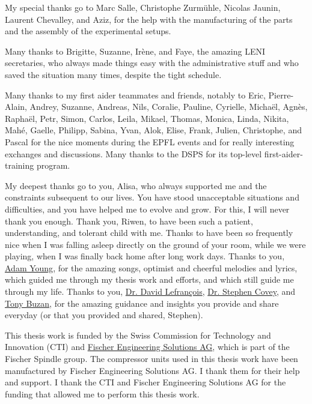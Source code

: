 My special thanks go to Marc Salle, Christophe Zurmühle, Nicolas
Jaunin, Laurent Chevalley, and Aziz, for the help with the
manufacturing of the parts and the assembly of the experimental
setups.

Many thanks to Brigitte, Suzanne, Irène, and Faye, the amazing LENI
secretaries, who always made things easy with the administrative stuff
and who saved the situation many times, despite the tight schedule.

Many thanks to my first aider teammates and friends, notably to Eric,
Pierre-Alain, Andrey, Suzanne, Andreas, Nils, Coralie, Pauline,
Cyrielle, Michaël, Agnès, Raphaël, Petr, Simon, Carlos, Leila, Mikael,
Thomas, Monica, Linda, Nikita, Mahé, Gaelle, Philipp, Sabina, Yvan,
Alok, Elise, Frank, Julien, Christophe, and Pascal for the nice
moments during the EPFL events and for really interesting exchanges
and discussions. Many thanks to the DSPS for its top-level
first-aider-training program.

My deepest thanks go to you, Alisa, who always supported me and the
constraints subsequent to our lives. You have stood unacceptable
situations and difficulties, and you have helped me to evolve and
grow. For this, I will never thank you enough. Thank you, Riwen, to
have been such a patient, understanding, and tolerant child with
me. Thanks to have been so frequently nice when I was falling asleep
directly on the ground of your room, while we were playing, when I was
finally back home after long work days. Thanks to you,
\href{https://en.wikipedia.org/wiki/Adam_Young}{Adam Young}, for the
amazing songs, optimist and cheerful melodies and lyrics, which guided
me through my thesis work and efforts, and which still guide me
through my life. Thanks to you,
\href{https://www.youtube.com/playlist?list=PLIB0FUzmhLoSCRLM2WFt_mz6plvulw6hU}{Dr. David
  Lefrançois},
\href{https://en.wikipedia.org/wiki/Stephen_Covey}{Dr. Stephen Covey},
and \href{https://en.wikipedia.org/wiki/Tony_Buzan}{Tony Buzan}, for
the amazing guidance and insights you provide and share everyday (or
that you provided and shared, Stephen).

This thesis work is funded by the Swiss Commission for Technology and
Innovation (CTI) and
\href{http://www.fischerspindle.com/facilities/fischer-engineering-solutions-ag/}{Fischer
  Engineering Solutions AG}, which is part of the Fischer Spindle
group. The compressor units used in this thesis work have been
manufactured by Fischer Engineering Solutions AG. I thank them for
their help and support. I thank the CTI and Fischer Engineering
Solutions AG for the funding that allowed me to perform this thesis
work.
